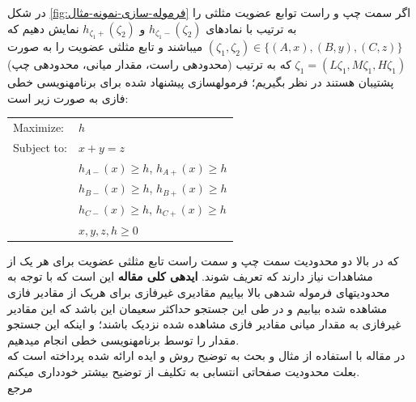 \documentclass[10pt,a4paper]{article}
\newcommand{\نیمفاصله}{\halfspace}
\renewcommand{\ }{\halfspace}
\newcommand{\renderref}[1] { \begingroup \let\clearpage\relax  \endgroup }
\newcommand{\؛}{،}
\begin{document}
در شکل
\ref{fig:فرموله-سازی-نمونه-مثال}
اگر سمت چپ و راست توابع عضویت مثلثی را به ترتیب با نمادهای
$h_{\zeta_1-}(\zeta_2)$ و $h_{\zeta_1+}(\zeta_2)$
نمایش دهیم که
$(\zeta_1, \zeta_2) \in \{(A, x), (B, y), (C, z)\}$
می\ باشند و تابع مثلثی عضویت را به صورت
$\zeta_1 = (L\zeta_1, M\zeta_1, H\zeta_1)$
که به ترتیب (محدوده\ ی راست، مقدار میانی، محدوده\ ی چپ) پشتیبان هستند در نظر بگیریم؛ فرموله\ سازی پیشنهاد شده برای برنامه\ نویسی خطی فازی به صورت زیر است:
\begin{latin}
\begin{table}[H]
    \begin{tabular}{ l l }
        Maximize:       & $h$\\
        Subject to:     & $x + y = z$\\
                        & $h_{A-}(x) \geq h$, $h_{A+}(x) \geq h$\\
                        & $h_{B-}(x) \geq h$, $h_{B+}(x) \geq h$\\
                        & $h_{C-}(x) \geq h$, $h_{C+}(x) \geq h$\\
                        & $x, y, z, h \geq 0$\\
    \end{tabular}  
\end{table}
\end{latin}
که در بالا دو محدودیت سمت چپ و سمت راست تابع مثلثی عضویت برای هر یک از مشاهدات نیاز دارند که تعریف شوند.
\textbf{ایده\ ی کلی مقاله}
این است که با توجه به محدودیت\ های فرموله شده\ ی بالا بیاییم مقادیری غیرفازی برای هریک از مقادیر فازی مشاهده شده بیابیم و در طی این جستجو حداکثر سعی\ مان این باشد که این مقادیر غیرفازی به مقدار میانی مقادیر فازی مشاهده شده نزدیک باشند؛ و اینکه این جستجو مقدار را توسط برنامه\ نویسی خطی انجام می\ دهیم.\\
در مقاله با استفاده از مثال و بحث به توضیح روش و ایده ارائه شده پرداخته است که بعلت محدودیت صفحاتی انتسابی به تکلیف از توضیح بیشتر خودداری میکنم.
\vspace{10pt}\\
{\LARGE مرجع}
\renderref{reference}
\end{document}
